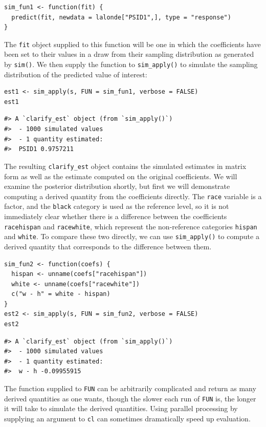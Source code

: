 \begin{verbatim}
sim_fun1 <- function(fit) {
  predict(fit, newdata = lalonde["PSID1",], type = "response")
}
\end{verbatim}
The \texttt{fit} object supplied to this function will be one in which the coefficients have been set to their values in a draw from their sampling distribution as generated by \texttt{sim()}. We then supply the function to \texttt{sim\_apply()} to simulate the sampling distribution of the predicted value of interest:
\begin{verbatim}
est1 <- sim_apply(s, FUN = sim_fun1, verbose = FALSE)
est1
\end{verbatim}
\begin{verbatim}
#> A `clarify_est` object (from `sim_apply()`)
#>  - 1000 simulated values
#>  - 1 quantity estimated:                
#>  PSID1 0.9757211
\end{verbatim}
The resulting \texttt{clarify\_est} object contains the simulated estimates in matrix form as well as the estimate computed on the original coefficients. We will examine the posterior distribution shortly, but first we will demonstrate computing a derived quantity from the coefficients directly.
The \texttt{race} variable is a factor, and the \texttt{black} category is used as the reference level, so it is not immediately clear whether there is a difference between the coefficients \texttt{racehispan} and \texttt{racewhite}, which represent the non-reference categories \texttt{hispan} and \texttt{white}. To compare these two directly, we can use \texttt{sim\_apply()} to compute a derived quantity that corresponds to the difference between them.
\begin{verbatim}
sim_fun2 <- function(coefs) {
  hispan <- unname(coefs["racehispan"])
  white <- unname(coefs["racewhite"])
  c("w - h" = white - hispan)
}
est2 <- sim_apply(s, FUN = sim_fun2, verbose = FALSE)
est2
\end{verbatim}
\begin{verbatim}
#> A `clarify_est` object (from `sim_apply()`)
#>  - 1000 simulated values
#>  - 1 quantity estimated:                  
#>  w - h -0.09955915
\end{verbatim}
The function supplied to \texttt{FUN} can be arbitrarily complicated and return as many derived quantities as one wants, though the slower each run of \texttt{FUN} is, the longer it will take to simulate the derived quantities. Using parallel processing by supplying an argument to \texttt{cl} can sometimes dramatically speed up evaluation.
